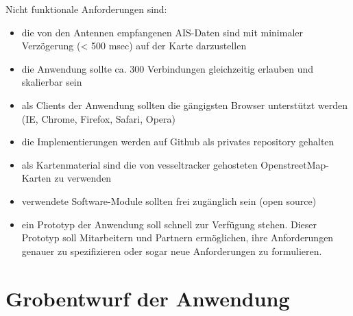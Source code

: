 Nicht funktionale Anforderungen sind:
\begin{itemize}
\item die von den Antennen empfangenen AIS-Daten sind mit minimaler Verzögerung (< 500 msec) auf der Karte darzustellen
\item die Anwendung sollte ca. 300 Verbindungen gleichzeitig erlauben und skalierbar sein
\item als Clients der Anwendung sollten die gängigsten Browser unterstützt werden (IE, Chrome, Firefox, Safari, Opera) 
\item die Implementierungen werden auf Github als privates repository gehalten
\item als Kartenmaterial sind die von vesseltracker gehosteten OpenstreetMap-Karten zu verwenden
\item verwendete Software-Module sollten frei zugänglich sein (open source) 
\item ein Prototyp der Anwendung soll schnell zur Verfügung stehen. Dieser Prototyp soll Mitarbeitern und Partnern ermöglichen, ihre Anforderungen genauer zu spezifizieren oder sogar neue Anforderungen zu formulieren. 
\end{itemize}

\section{Grobentwurf der Anwendung}\label{s.Grobentwurf der Anwendung}

